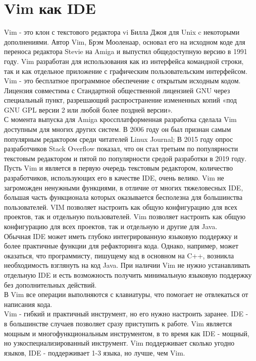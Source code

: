 \section{Vim как IDE}
Vim - это клон с текстового редактора vi Билла Джоя для Unix c некоторыми дополнениями. Автор Vim, 
Брэм Мооленаар, основал его на исходном коде для переноса редактора Stevie на Amiga и выпустил
общедоступную версию в 1991 году. Vim разработан для использования как из интерфейса командной 
строки, так и как отдельное приложение с графическим пользовательским интерфейсом. Vim - это 
бесплатное программное обеспечение с открытым исходным кодом. Лицензия совместима с Стандартной
общественной лицензией GNU через специальный пункт, разрешающий распространение измененных копий 
«под GNU GPL версии 2 или любой более поздней версии».\\

С момента выпуска для Amiga кроссплатформенная разработка сделала Vim доступным для многих других 
систем. В 2006 году он был признан самым популярным редактором среди читателей Linux Journal; В 
2015 году опрос разработчиков Stack Overflow показал, что он стал третьим по популярности текстовым
редактором и пятой по популярности средой разработки в 2019 году.\\

Пусть Vim и является в первую очередь текстовым редактором, количество разработчиков, использующих 
его в качестве IDE, очень велико. Vim не загроможден ненужными функциями, в отличие от многих 
тяжеловесных IDE, большая часть функционала которых оказывается бесполезна для большинства пользователей. VIM позволяет настроить как общую конфигурацию для всех проектов, так и отдельную 
пользователей. Vim позволяет настроить как общую конфигурацию для всех проектов, так и отдельную 
и другие для Java.\\

Обычная IDE может иметь глубоко интегрированную языковую поддержку и более практичные функции для рефакторинга кода. Однако, например, может оказаться, что программисту, пишущему код в основном на 
C++, возникла необходимость взглянуть на код Java. При наличии Vim не нужно устанавливать отдельную
IDE и есть возможность получить минимальную языковую поддержку без дополнительных действий. \\

В Vim все операции выполняются с клавиатуры, что помогает не отвлекаться от написания кода.\\ 

Vim - гибкий и практичный инструмент, но его нужно настроить заранее. IDE - в большинстве случаев
позволяет сразу приступить к работе. Vim является мощным и многофункциональным инструментом, в то 
время как IDE - мощный, но узкоспециализированный инструмент. Vim поддерживает сколько угодно языков, 
IDE - поддерживает 1-3 языка, но лучше, чем Vim.\\

